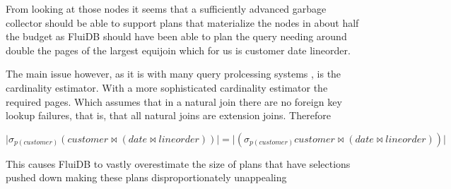 From looking at those nodes it seems that a sufficiently advanced
garbage collector should be able to support plans that materialize the
nodes in about half the budget as FluiDB should have been able to plan
the query needing around double the pages of the largest equijoin
which for us is customer date lineorder.

The main issue however, as it is with many query prolcessing systems
\cite{leisHowGoodAre2015}, is the cardinality estimator. With a more
sophisticated cardinality estimator the required pages. Which assumes
that in a natural join there are no foreign key lookup failures, that
is, that all natural joins are extension joins. Therefore

\[
\lvert \sigma _{p(customer)} (customer \Join (date \Join lineorder)) \rvert = \lvert (\sigma _{p(customer)} customer \Join (date \Join lineorder)) \rvert
\]


This causes FluiDB to vastly overestimate the size of plans that have
selections pushed down making these plans disproportionately
unappealing
